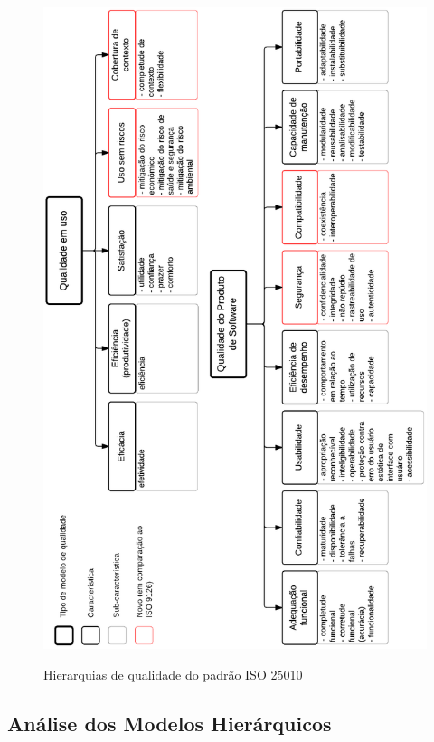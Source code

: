 \documentclass[
	12pt,				%
	openright,			%
	oneside,			%
	a4paper,			%
	english,			%
	brazil,				%
	]{abntex2}
\begin{document}
\begin{figure}[H]
    \centering
    \caption{Hierarquias de qualidade do padrão ISO 25010}
    \graphicspath{ {./graphics/} }
    \includegraphics[scale=0.9]{iso25010-hierarquia_qualidade_completa-andrei-rev2}
    \label{fig:iso25010-hierarquia_qualidade_completa}
\end{figure}

\subsection{Análise dos Modelos Hierárquicos}
\end{document}
